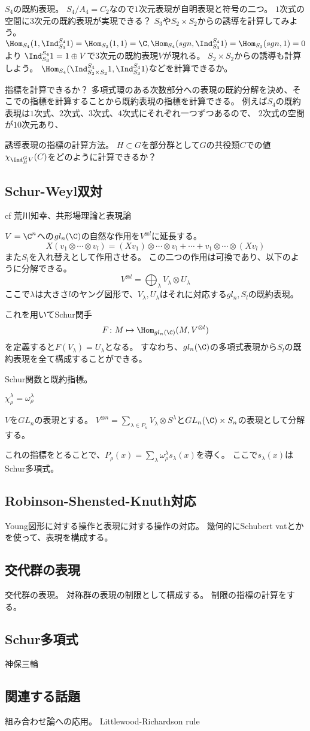 \documentclass{jsarticle}
\begin{document}
$S_4$の既約表現。
$S_4/A_4=C_2$なので$1$次元表現が自明表現と符号の二つ。
$1$次式の空間に$3$次元の既約表現が実現できる？
$S_3$や$S_2\times S_2$からの誘導を計算してみよう。
$\Hom_{S_4}(1,\Ind^{S_4}_{S_3}1)=\Hom_{S_3}(1,1)=\C, \Hom_{S_4}(sgn,\Ind^{S_4}_{S_3}1)=\Hom_{S_3}(sgn,1)=0$より
$\Ind^{S_4}_{S_3}1=1\oplus V$で$3$次元の既約表現$V$が現れる。
$S_2\times S_2$からの誘導も計算しよう。
$\Hom_{S_4}(\Ind^{S_4}_{S_2\times S_2}1,\Ind^{S_4}_{S_3}1)$などを計算できるか。

指標を計算できるか？
多項式環のある次数部分への表現の既約分解を決め、そこでの指標を計算することから既約表現の指標を計算できる。
例えば$S_4$の既約表現は$1$次式、$2$次式、$3$次式、$4$次式にそれぞれ一つずつあるので、
$2$次式の空間が$10$次元あり、

誘導表現の指標の計算方法。
$H\subset G$を部分群として$G$の共役類$C$での値$\chi_{\Ind^G_HV}(C)$をどのように計算できるか？

\subsection{Schur-Weyl双対}
cf 荒川知幸、共形場理論と表現論

$V=\C^n$への$gl_n(\C)$の自然な作用を$V^{\otimes l}$に延長する。
\[
X(v_1\otimes\cdots\otimes v_l)=(Xv_1)\otimes\cdots\otimes v_l+\cdots+v_1\otimes\cdots\otimes(Xv_l)
\]
また$S_l$を入れ替えとして作用させる。
この二つの作用は可換であり、以下のように分解できる。
\[
V^{\otimes l}=\bigoplus_\lambda V_\lambda\otimes U_\lambda
\]
ここで$\lambda$は大きさ$l$のヤング図形で、$V_\lambda, U_\lambda$はそれに対応する$gl_n, S_l$の既約表現。

これを用いてSchur関手
\[
F\colon M\mapsto \Hom_{gl_n(\C)}(M,V^{\otimes l})
\]
を定義すると$F(V_\lambda)=U_\lambda$となる。
すなわち、$gl_n(\C)$の多項式表現から$S_l$の既約表現を全て構成することができる。

Schur関数と既約指標。
\begin{thm}
$\chi^\lambda_\rho=\omega^\lambda_\rho$
\end{thm}
\begin{thm}
$V$を$GL_n$の表現とする。
$V^{\otimes n}=\sum_{\lambda\in P_n}V_\lambda\otimes S^\lambda$と$GL_n(\C)\times S_n$の表現として分解する。
\end{thm}
これの指標をとることで、$P_\rho(x)=\sum_\lambda\omega^\lambda_\rho s_\lambda(x)$を導く。
ここで$s_\lambda(x)$はSchur多項式。

\subsection{Robinson-Shensted-Knuth対応}
Young図形に対する操作と表現に対する操作の対応。
幾何的にSchubert vatとかを使って、表現を構成する。

\subsection{交代群の表現}
交代群の表現。
対称群の表現の制限として構成する。
制限の指標の計算をする。

\subsection{Schur多項式}
神保三輪

\subsection{関連する話題}

組み合わせ論への応用。
Littlewood-Richardson rule
\end{document}
